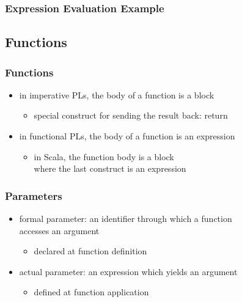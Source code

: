 \documentclass[dvipsnames]{beamer}
\theoremstyle{plain}
\begin{document}
\begin{frame}
  \frametitle{Expression Evaluation Example}

  \begin{example}

    \pause
    \medskip

    \pause
    \medskip

    \pause
    \medskip
  \end{example}
\end{frame}

\subsection{Functions}

\begin{frame}
  \frametitle{Functions}

  \begin{itemize}
    \item in imperative PLs, the body of a function is a block
    \begin{itemize}
      \item special construct for sending the result back: \alert{return}
    \end{itemize}

    \pause
    \bigskip
    \item in functional PLs, the body of a function is an expression
    \begin{itemize}
      \item in Scala, the function body is a block\\
        where the last construct is an expression
    \end{itemize}
  \end{itemize}
\end{frame}

\begin{frame}
  \frametitle{Parameters}

  \begin{itemize}
    \item \alert{formal parameter}: an identifier through which a function\\
      accesses an argument
    \begin{itemize}
      \item declared at function definition
    \end{itemize}

    \pause
    \medskip
    \item \alert{actual parameter}: an expression which yields an argument
    \begin{itemize}
      \item defined at function application
    \end{itemize}
  \end{itemize}
\end{frame}
\end{document}
